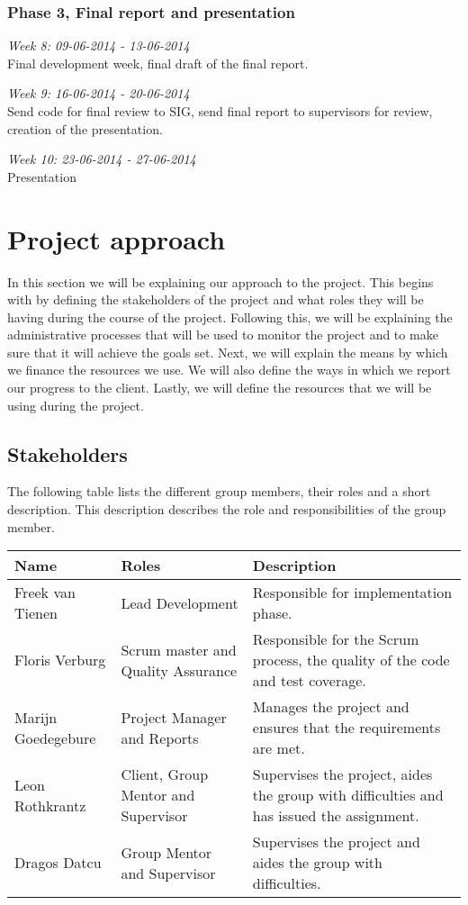 \documentclass[]{article}
\begin{document}
\subsubsection{Phase 3, Final report and presentation}

\noindent\emph{Week 8: 09-06-2014 - 13-06-2014}\\
Final development week, final draft of the final report.

\noindent\emph{Week 9: 16-06-2014 - 20-06-2014}\\
Send code for final review to SIG, send final report to supervisors for review, creation of the presentation.

\noindent\emph{Week 10: 23-06-2014 - 27-06-2014}\\
Presentation
\section{Project approach}
In this section we will be explaining our approach to the project.
This begins with by defining the stakeholders of the project and what roles they will be having during the course of the project.
Following this, we will be explaining the administrative processes that will be used to monitor the project and to make sure that it will achieve the goals set.
Next, we will explain the means by which we finance the resources we use.
We will also define the ways in which we report our progress to the client.
Lastly, we will define the resources that we will be using during the project.

\subsection{Stakeholders}
The following table lists the different group members, their roles and a short description.
This description describes the role and responsibilities of the group member.\\
\begin{tabular}{|l|l|p{5cm}|}
\hline
Name & Roles & Description\\
\hline
Freek van Tienen & Lead Development & Responsible for implementation phase.\\
\hline
Floris Verburg & Scrum master and Quality Assurance & Responsible for the Scrum process, the quality of the code and test coverage.\\
\hline
Marijn Goedegebure & Project Manager and Reports & Manages the project and ensures that the requirements are met.\\
\hline
Leon Rothkrantz & Client, Group Mentor and Supervisor & Supervises the project, aides the group with difficulties and has issued the assignment.\\
\hline
Dragos Datcu &  Group Mentor and Supervisor & Supervises the project and aides the group with difficulties.\\
\hline
\end{tabular}
\end{document}
